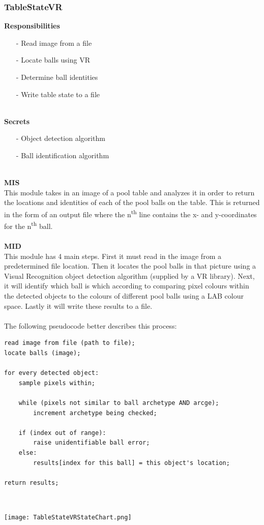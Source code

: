 \documentclass[titlepage]{article}
\begin{document}
\subsubsection{TableStateVR}
\textbf{Responsibilities}
\begin{itemize}
	\item[-] Read image from a file
	\item[-] Locate balls using VR
	\item[-] Determine ball identities
	\item[-] Write table state to a file
\end{itemize}~\\
\textbf{Secrets}
\begin{itemize}
	\item[-] Object detection algorithm
	\item[-] Ball identification algorithm
\end{itemize}~\\
\textbf{MIS}\\[2mm]
This module takes in an image of a pool table and analyzes it in order to return the locations and identities of each of the pool balls on the table. This is returned in the form of an output file where the n\textsuperscript{th} line contains the x- and y-coordinates for the n\textsuperscript{th} ball.
\\\\
\textbf{MID}\\[2mm]
This module has 4 main steps. First it must read in the image from a predetermined file location. Then it locates the pool balls in that picture using a Visual Recognition object detection algorithm (supplied by a VR library). Next, it will identify which ball is which according to comparing pixel colours within the detected objects to the colours of different pool balls using a LAB colour space. Lastly it will write these results to a file.\\~\\
The following pseudocode better describes this process:
\begin{lstlisting}
read image from file (path to file);
locate balls (image);

for every detected object:
	sample pixels within;
	
	while (pixels not similar to ball archetype AND arcge);
		increment archetype being checked;
		
	if (index out of range):
		raise unidentifiable ball error;
	else:
		results[index for this ball] = this object's location;

return results;
\end{lstlisting}~\\[-10mm]
\begin{center}
	\texttt{[image: TableStateVRStateChart.png]}
\label{fig:TableStateVRStateChart}
\end{center}~\\
\end{document}
